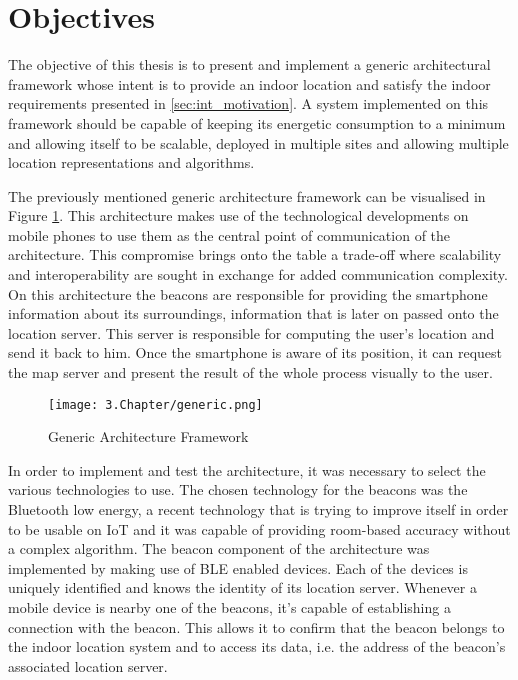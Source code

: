 \section{Objectives} 
\label{sec:objectives} 
 
 
The objective of this thesis is to present and implement a generic architectural framework whose intent is to provide an indoor location and satisfy the indoor requirements presented in \ref{sec:int_motivation}. A system implemented on this framework should be capable of keeping its energetic consumption to a minimum and allowing itself to be scalable, deployed in multiple sites and allowing multiple location representations and algorithms. 
 
  
The previously mentioned generic architecture framework can be visualised in Figure \ref{fig:solution}. This architecture makes use of the technological developments on mobile phones to use them as the central point of communication of the architecture. This compromise brings onto the table a trade-off where scalability and interoperability are sought in exchange for added communication complexity. On this architecture the beacons are responsible for providing the smartphone information about its surroundings, information that is later on passed onto the location server. This server is responsible for computing the user's location and send it back to him. Once the smartphone is aware of its position, it can request the map server and present the result of the whole process visually to the user. 
 

 \begin{figure}[H] 
\centering 
\texttt{[image: 3.Chapter/generic.png]} 
\caption[Generic Architecture Framework]{Generic Architecture Framework } 
\label{fig:solution} 
\end{figure} 
  
 
In order to implement and test the architecture, it was necessary to select the various technologies to use. The chosen technology for the beacons was the Bluetooth low energy, a recent technology that is trying to improve itself in order to be usable on \ac{IoT} and it was capable of providing room-based accuracy without a complex algorithm. The beacon component of the architecture was implemented by making use of \ac{BLE} enabled devices. Each of the devices is uniquely identified and knows the identity of its location server. Whenever a mobile device is nearby one of the beacons, it's capable of establishing a connection with the beacon. This allows it to confirm that the beacon belongs to the indoor location system and to access its data, i.e. the address of the beacon's associated location server. 
 
